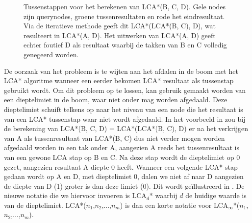 \begin{figure}
\begin{subfigure}{0.33\linewidth}
\begin{tikzpicture}[node distance=3cm, level distance=1.5cm,
            every node/.style={draw, thick, circle,inner sep=5pt},
            every path/.style={->, draw, thick, -latex'}]
              
        \end{tikzpicture}
        \caption{}
        \label{tikz:lca*bcd3}
    \end{subfigure}
    \caption{Tussenstappen voor het berekenen van LCA*(B, C, D). Gele nodes zijn
    querynodes, groene tussenresultaten en rode het eindresultaat. Via de
    iteratieve methode geeft dit LCA*(LCA*(B, C), D), wat resulteert in LCA*(A,
    D). Het uitwerken van LCA*(A, D) geeft echter foutief D als resultaat
    waarbij de takken van B en C volledig genegeerd worden.}
    \label{fig:lca*bcd}
\end{figure}

De oorzaak van het probleem is te wijten aan het afdalen in de boom met het LCA*
algoritme wanneer een eerder bekomen LCA* resultaat als tussenstap gebruikt
wordt. Om dit probleem op te lossen, kan gebruik gemaakt worden van een
dieptelimiet in de boom, waar niet onder mag worden afgedaald. Deze dieptelimiet
schuift telkens op naar het niveau van een node die het resultaat is van een
LCA* tussenstap waar niet wordt afgedaald. In het voorbeeld in
 zou bij de berekening van LCA*(B, C, D) = LCA*(LCA*(B, C),
D) er na het verkrijgen van A als tussenresultaat van LCA*(B, C) dus niet verder
mogen worden afgedaald worden in een tak onder A, aangezien A reeds het
tussenresultaat is van een gewone LCA stap op B en C. Na deze stap wordt de
dieptelimiet op 0 gezet, aangezien resultaat A diepte 0 heeft. Wanneer een
volgende LCA* stap gedaan wordt op A en D, met dieptelimiet 0, dalen we niet af
naar D aangezien de diepte van D (1) groter is dan deze limiet (0). Dit wordt
geïllustreerd in . De nieuwe notatie die we hiervoor
invoeren is $\text{LCA}_d$* waarbij $d$ de huidige waarde is van de
dieptelimiet. LCA*($n_1$,$n_2$,...,$n_m$) is dan een korte notatie voor 
$\text{LCA}_\infty$*($n_1$,$n_2$,...,$n_m$).

